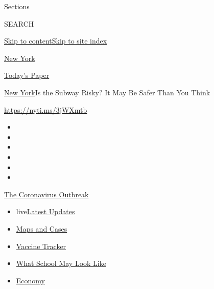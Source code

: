 Sections

SEARCH

\protect\hyperlink{site-content}{Skip to
content}\protect\hyperlink{site-index}{Skip to site index}

\href{https://www.nytimes3xbfgragh.onion/section/nyregion}{New York}

\href{https://myaccount.nytimes3xbfgragh.onion/auth/login?response_type=cookie\&client_id=vi}{}

\href{https://www.nytimes3xbfgragh.onion/section/todayspaper}{Today's
Paper}

\href{/section/nyregion}{New York}\textbar{}Is the Subway Risky? It May
Be Safer Than You Think

\url{https://nyti.ms/3jWXmtb}

\begin{itemize}
\item
\item
\item
\item
\item
\item
\end{itemize}

\href{https://www.nytimes3xbfgragh.onion/news-event/coronavirus?action=click\&pgtype=Article\&state=default\&region=TOP_BANNER\&context=storylines_menu}{The
Coronavirus Outbreak}

\begin{itemize}
\tightlist
\item
  live\href{https://www.nytimes3xbfgragh.onion/2020/08/02/world/coronavirus-updates.html?action=click\&pgtype=Article\&state=default\&region=TOP_BANNER\&context=storylines_menu}{Latest
  Updates}
\item
  \href{https://www.nytimes3xbfgragh.onion/interactive/2020/us/coronavirus-us-cases.html?action=click\&pgtype=Article\&state=default\&region=TOP_BANNER\&context=storylines_menu}{Maps
  and Cases}
\item
  \href{https://www.nytimes3xbfgragh.onion/interactive/2020/science/coronavirus-vaccine-tracker.html?action=click\&pgtype=Article\&state=default\&region=TOP_BANNER\&context=storylines_menu}{Vaccine
  Tracker}
\item
  \href{https://www.nytimes3xbfgragh.onion/interactive/2020/07/29/us/schools-reopening-coronavirus.html?action=click\&pgtype=Article\&state=default\&region=TOP_BANNER\&context=storylines_menu}{What
  School May Look Like}
\item
  \href{https://www.nytimes3xbfgragh.onion/live/2020/07/31/business/stock-market-today-coronavirus?action=click\&pgtype=Article\&state=default\&region=TOP_BANNER\&context=storylines_menu}{Economy}
\end{itemize}

